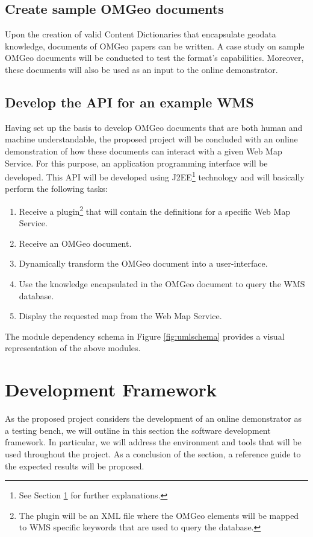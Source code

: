 \documentclass[a4paper,11pt,openany,notitlepage]{article}
\begin{document}
\subsection{Create sample OMGeo documents} \label{subsec:sample}
\indent

Upon the creation of valid Content Dictionaries that encapsulate geodata knowledge, documents of OMGeo papers can be written. A case study on sample OMGeo documents will be conducted to test the format's capabilities. Moreover, these documents will also be used as an input to the online demonstrator.

\subsection{Develop the API for an example WMS} \label{subsec:demonstrator}
\indent

Having set up the basis to develop OMGeo documents that are both human and machine understandable, the proposed project will be concluded with an online demonstration of how these documents can interact with a given Web Map Service. For this purpose, an application programming interface will be developed. This API will be developed using J2EE\footnote{See Section \ref{sec:development} for further explanations.} technology and will basically perform the following tasks:
\begin{enumerate}
	\item Receive a plugin\footnote{The plugin will be an XML file where the OMGeo elements will be mapped to WMS specific keywords that are used to query the database.} that will contain the definitions for a specific Web Map Service.
	\item Receive an OMGeo document.
	\item Dynamically transform the OMGeo document into a user-interface.
	\item Use the knowledge encapsulated in the OMGeo document to query the WMS database.
	\item Display the requested map from the Web Map Service.
\end{enumerate}
The module dependency schema in Figure \ref{fig:umlschema} provides a visual representation of the above modules.

%
\section{Development Framework} \label{sec:development}
\indent

As the proposed project considers the development of an online demonstrator as a testing bench, we will outline in this section the software development framework. In particular, we will address the environment and tools that will be used throughout the project. As a conclusion of the section, a reference guide to the expected results will be proposed.
\end{document}

